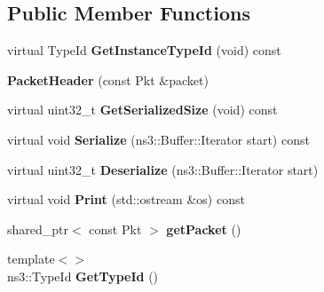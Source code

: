 \subsection*{Public Member Functions}
\begin{DoxyCompactItemize}
\item 
virtual Type\+Id {\bfseries Get\+Instance\+Type\+Id} (void) const\hypertarget{classns3_1_1ndn_1_1PacketHeader_a7eece24bbc06567c60ce41ba9d04fce3}{}\label{classns3_1_1ndn_1_1PacketHeader_a7eece24bbc06567c60ce41ba9d04fce3}

\item 
{\bfseries Packet\+Header} (const Pkt \&packet)\hypertarget{classns3_1_1ndn_1_1PacketHeader_a54b23cb5eb3d1eda10c42a9b4f81086b}{}\label{classns3_1_1ndn_1_1PacketHeader_a54b23cb5eb3d1eda10c42a9b4f81086b}

\item 
virtual uint32\+\_\+t {\bfseries Get\+Serialized\+Size} (void) const\hypertarget{classns3_1_1ndn_1_1PacketHeader_a95b30c1ce2994140d43c8c2dd62f93cb}{}\label{classns3_1_1ndn_1_1PacketHeader_a95b30c1ce2994140d43c8c2dd62f93cb}

\item 
virtual void {\bfseries Serialize} (ns3\+::\+Buffer\+::\+Iterator start) const\hypertarget{classns3_1_1ndn_1_1PacketHeader_a3329ab713202f3fcd0c5fac57dbd7b45}{}\label{classns3_1_1ndn_1_1PacketHeader_a3329ab713202f3fcd0c5fac57dbd7b45}

\item 
virtual uint32\+\_\+t {\bfseries Deserialize} (ns3\+::\+Buffer\+::\+Iterator start)\hypertarget{classns3_1_1ndn_1_1PacketHeader_a2d5bdbf4e30c8e410c771091473127a4}{}\label{classns3_1_1ndn_1_1PacketHeader_a2d5bdbf4e30c8e410c771091473127a4}

\item 
virtual void {\bfseries Print} (std\+::ostream \&os) const\hypertarget{classns3_1_1ndn_1_1PacketHeader_a204759385288f5cb583c7b71a7f04c5e}{}\label{classns3_1_1ndn_1_1PacketHeader_a204759385288f5cb583c7b71a7f04c5e}

\item 
shared\+\_\+ptr$<$ const Pkt $>$ {\bfseries get\+Packet} ()\hypertarget{classns3_1_1ndn_1_1PacketHeader_a3fa625015b35fba9857552209273c452}{}\label{classns3_1_1ndn_1_1PacketHeader_a3fa625015b35fba9857552209273c452}

\item 
{\footnotesize template$<$$>$ }\\ns3\+::\+Type\+Id {\bfseries Get\+Type\+Id} ()\hypertarget{classns3_1_1ndn_1_1PacketHeader_ae67a7e7b40153a1b218de6e02c887e7a}{}\label{classns3_1_1ndn_1_1PacketHeader_ae67a7e7b40153a1b218de6e02c887e7a}


\end{DoxyCompactItemize}
